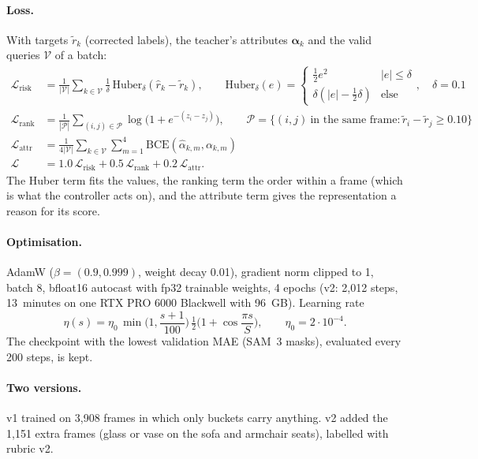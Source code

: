 \documentclass[10pt,a4paper]{article}
\begin{document}
\paragraph{Loss.} With targets $\tilde r_k$ (corrected labels), the teacher's attributes $\bm\alpha_k$ and the valid queries
$\mathcal V$ of a batch:
\begin{align}
\mathcal L_{\text{risk}} &= \frac{1}{|\mathcal V|}\sum_{k\in\mathcal V}\frac{1}{\delta}\,\mathrm{Huber}_\delta(\hat r_k-\tilde r_k),\qquad
\mathrm{Huber}_\delta(e)=\begin{cases}\tfrac12 e^2 & |e|\leq\delta\\ \delta(|e|-\tfrac12\delta) & \text{else}\end{cases},\quad \delta=0.1\\
\mathcal L_{\text{rank}} &= \frac{1}{|\mathcal P|}\sum_{(i,j)\in\mathcal P}\log\big(1+e^{-(z_i-z_j)}\big),\qquad
\mathcal P=\{(i,j)\ \text{in the same frame}: \tilde r_i-\tilde r_j\geq0.10\}\\
\mathcal L_{\text{attr}} &= \frac{1}{4|\mathcal V|}\sum_{k\in\mathcal V}\sum_{m=1}^{4}\mathrm{BCE}(\hat\alpha_{k,m},\alpha_{k,m})\\
\mathcal L &= 1.0\,\mathcal L_{\text{risk}} + 0.5\,\mathcal L_{\text{rank}} + 0.2\,\mathcal L_{\text{attr}}.
\end{align}
The Huber term fits the values, the ranking term the order within a frame (which is what the controller acts on), and the
attribute term gives the representation a reason for its score.

\paragraph{Optimisation.} AdamW ($\beta=(0.9,0.999)$, weight decay 0.01), gradient norm clipped to 1, batch 8, bfloat16 autocast
with fp32 trainable weights, 4 epochs (v2: 2{,}012 steps, 13~minutes on one RTX PRO 6000 Blackwell with 96~GB). Learning rate
\begin{equation}
\eta(s) = \eta_0\,\min\!\Big(1,\frac{s+1}{100}\Big)\,\tfrac12\Big(1+\cos\frac{\pi s}{S}\Big),\qquad \eta_0=2\cdot10^{-4}.
\end{equation}
The checkpoint with the lowest validation MAE (SAM~3 masks), evaluated every 200 steps, is kept.

\paragraph{Two versions.} v1 trained on 3{,}908 frames in which only buckets carry anything. v2 added the 1{,}151 extra frames
(glass or vase on the sofa and armchair seats), labelled with rubric v2.
\end{document}
